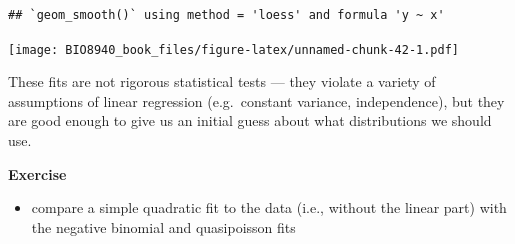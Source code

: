 \documentclass[
  12pt,
]{book}
\providecommand{\tightlist}{%
  \setlength{\itemsep}{0pt}\setlength{\parskip}{0pt}}
\begin{document}
\begin{verbatim}
## `geom_smooth()` using method = 'loess' and formula 'y ~ x'
\end{verbatim}

\texttt{[image: BIO8940\_book\_files/figure-latex/unnamed-chunk-42-1.pdf]}

These fits are not rigorous statistical tests --- they violate a variety of assumptions of linear regression (e.g.~constant variance, independence), but they are good enough to give us an initial guess about what distributions we should use.

\textbf{Exercise}

\begin{itemize}
\tightlist
\item
  compare a simple quadratic fit to the data (i.e., without the linear part) with the negative binomial and quasipoisson fits
\end{itemize}
\end{document}
